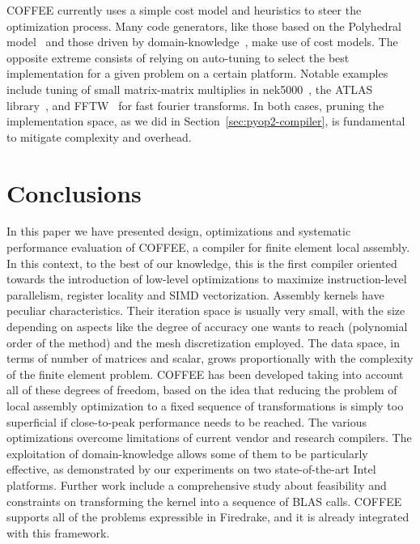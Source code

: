 \documentclass[conference]{IEEEtran}
\begin{document}
COFFEE currently uses a simple cost model and heuristics to steer the optimization process. Many code generators, like those based on the Polyhedral model~\cite{PLUTO} and those driven by domain-knowledge~\cite{modeldriven}, make use of cost models. The opposite extreme consists of relying on auto-tuning to select the best implementation for a given problem on a certain platform. Notable examples include tuning of small matrix-matrix multiplies in nek5000~\cite{nek5000}, the ATLAS library~\cite{ATLAS}, and FFTW~\cite{FFTW} for fast fourier transforms. In both cases, pruning the implementation space, as we did in Section~\ref{sec:pyop2-compiler}, is fundamental to mitigate complexity and overhead. 




\section{Conclusions}
\label{sec:conclusions}

In this paper we have presented design, optimizations and systematic performance evaluation of COFFEE, a compiler for finite element local assembly. In this context, to the best of our knowledge, this is the first compiler oriented towards the introduction of low-level optimizations to maximize instruction-level parallelism, register locality and SIMD vectorization. Assembly kernels have peculiar characteristics. Their iteration space is usually very small, with the size depending on aspects like the degree of accuracy one wants to reach (polynomial order of the method) and the mesh discretization employed. The data space, in terms of number of matrices and scalar, grows proportionally with the complexity of the finite element problem. COFFEE has been developed taking into account all of these degrees of freedom, based on the idea that reducing the problem of local assembly optimization to a fixed sequence of transformations is simply too superficial if close-to-peak performance needs to be reached. The various optimizations overcome limitations of current vendor and research compilers. The exploitation of domain-knowledge allows some of them to be particularly effective, as demonstrated by our experiments on two state-of-the-art Intel platforms. Further work include a comprehensive study about feasibility and constraints on transforming the kernel into a sequence of BLAS calls. COFFEE supports all of the problems expressible in Firedrake, and it is already integrated with this framework. 
\end{document}
